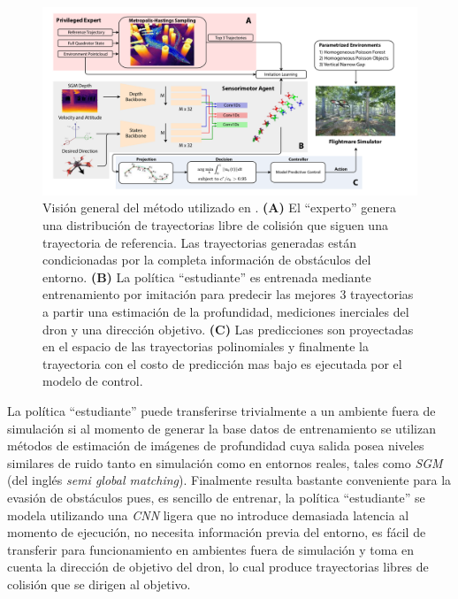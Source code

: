    \begin{figure}[H]
        \centering
        \includegraphics[scale=0.3]{partes/img/agile-autonomy-overview.png}
        \caption[Visión general del método del método utilizado en \textit{Learning high-speed flight in the wild}]{Visión general del método utilizado en \cite{Loquercio2021}. \textbf{(A)} El ``experto'' genera una distribución de trayectorias libre de colisión que siguen una trayectoria de referencia. Las trayectorias generadas están condicionadas por la completa información de obstáculos del entorno. \textbf{(B)} La política ``estudiante'' es entrenada mediante entrenamiento por imitación para predecir las mejores 3 trayectorias a partir una estimación de la profundidad, mediciones inerciales del dron y una dirección objetivo. \textbf{(C)} Las predicciones son proyectadas en el espacio de las trayectorias polinomiales y finalmente la trayectoria con el costo de predicción mas bajo es ejecutada por el modelo de control. }
        \label{fig:agile-autonomy-overview}
    \end{figure}
    
    La política ``estudiante'' puede transferirse trivialmente a un ambiente fuera de simulación si al momento de generar la base datos de entrenamiento se utilizan métodos de estimación de imágenes de profundidad cuya salida posea niveles similares de ruido tanto en simulación como en entornos reales, tales como \textit{SGM} \cite{Hirschmüller2007} (del inglés \textit{semi global matching}). Finalmente  \cite{Loquercio2021} resulta bastante conveniente para la evasión de obstáculos pues, es sencillo de entrenar, la política ``estudiante'' se modela utilizando una \textit{CNN} ligera \cite{Howard2019} que no introduce demasiada latencia al momento de ejecución, no necesita información previa del entorno, es fácil de transferir para funcionamiento en ambientes fuera de simulación y toma en cuenta la dirección de objetivo del dron, lo cual produce trayectorias libres de colisión que se dirigen al objetivo.

